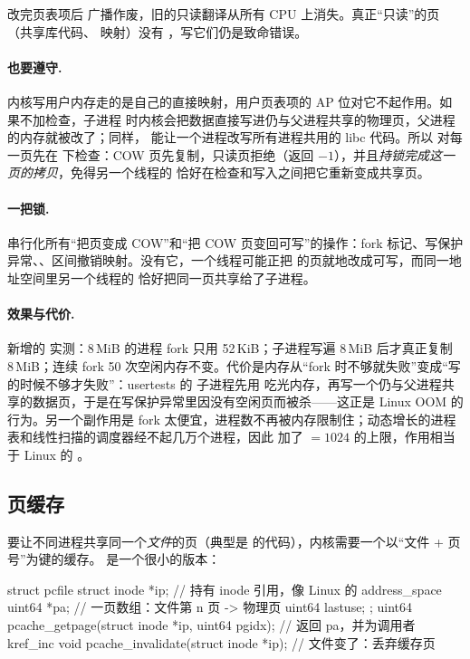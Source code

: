改完页表项后  广播作废，旧的只读翻译从所有 CPU 上消失。真正“只读”的页（共享库代码、 映射）没有 ，写它们仍是致命错误。

\paragraph{ 也要遵守.} 内核写用户内存走的是自己的直接映射，用户页表项的 AP 位对它不起作用。如果不加检查，子进程  时内核会把数据直接写进仍与父进程共享的物理页，父进程的内存就被改了；同样， 能让一个进程改写所有进程共用的 libc 代码。所以  对每一页先在  下检查：COW 页先复制，只读页拒绝（返回 $-1$），并且\emph{持锁完成这一页的拷贝}，免得另一个线程的  恰好在检查和写入之间把它重新变成共享页。

\paragraph{一把锁.}  串行化所有“把页变成 COW”和“把 COW 页变回可写”的操作：fork 标记、写保护异常、、区间撤销映射。没有它，一个线程可能正把  的页就地改成可写，而同一地址空间里另一个线程的  恰好把同一页共享给了子进程。

\paragraph{效果与代价.} 新增的  实测：8\,MiB 的进程 fork 只用 52\,KiB；子进程写遍 8\,MiB 后才真正复制 8\,MiB；连续 fork 50 次空闲内存不变。代价是内存从“fork 时不够就失败”变成“写的时候不够才失败”：usertests 的  子进程先用  吃光内存，再写一个仍与父进程共享的数据页，于是在写保护异常里因没有空闲页而被杀——这正是 Linux OOM 的行为。另一个副作用是 fork 太便宜，进程数不再被内存限制住；动态增长的进程表和线性扫描的调度器经不起几万个进程，因此  加了  $=1024$ 的上限，作用相当于 Linux 的 。

\subsection{页缓存}

要让不同进程共享同一个\emph{文件}的页（典型是  的代码），内核需要一个以“文件 + 页号”为键的缓存。 是一个很小的版本：

\begin{ccode}
struct pcfile {
  struct inode *ip;     // 持有 inode 引用，像 Linux 的 address_space
  uint64 *pa;           // 一页数组：文件第 n 页 -> 物理页
  uint64 lastuse;
};
uint64 pcache_getpage(struct inode *ip, uint64 pgidx);  // 返回 pa，并为调用者 kref_inc
void   pcache_invalidate(struct inode *ip);             // 文件变了：丢弃缓存页
\end{ccode}

